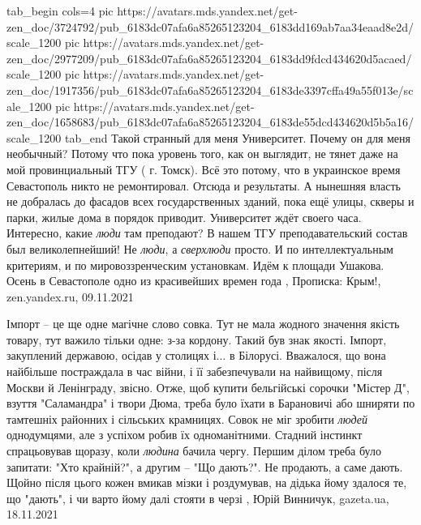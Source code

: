 \ifcmt
  tab_begin cols=4
     pic https://avatars.mds.yandex.net/get-zen_doc/3724792/pub_6183dc07afa6a85265123204_6183dd169ab7aa34eaad8e2d/scale_1200
     pic https://avatars.mds.yandex.net/get-zen_doc/2977209/pub_6183dc07afa6a85265123204_6183dd9fdcd434620d5acaed/scale_1200
		 pic https://avatars.mds.yandex.net/get-zen_doc/1917356/pub_6183dc07afa6a85265123204_6183de3397cffa49a55f013e/scale_1200
		 pic https://avatars.mds.yandex.net/get-zen_doc/1658683/pub_6183dc07afa6a85265123204_6183de55dcd434620d5b5a16/scale_1200
  tab_end
\fi
Такой странный для меня Университет. Почему он для меня необычный? Потому что
пока уровень того, как он выглядит, не тянет даже на мой провинциальный ТГУ (
г. Томск).  Всё это потому, что в украинское время Севастополь никто не
ремонтировал. Отсюда и результаты. А нынешняя власть не добралась до фасадов
всех государственных зданий, пока ещё улицы, скверы и парки, жилые дома в
порядок приводит. Университет ждёт своего часа.  Интересно, какие\emph{ люди}
там преподают? В нашем ТГУ преподавательский состав был великолепнейший! Не
\emph{люди}, а \emph{сверхлюди} просто. И по интеллектуальным критериям, и по
мировоззренческим установкам.  Идём к площади Ушакова. Осень в Севастополе одно
из красивейших времен года
, 
Прописка: Крым!, zen.yandex.ru, 09.11.2021

Імпорт – це ще одне магічне слово совка. Тут не мала жодного значення якість
товару, тут важило тільки одне: з-за кордону. Такий був знак якості. Імпорт,
закуплений державою, осідав у столицях і... в Білорусі. Вважалося, що вона
найбільше постраждала в час війни, і її забезпечували на найвищому, після
Москви й Ленінграду, звісно. Отже, щоб купити бельгійські сорочки "Містер Д",
взуття "Саламандра" і твори Дюма, треба було їхати в Барановичі або шниряти по
тамтешніх районних і сільських крамницях.  Совок не міг зробити \emph{людей}
однодумцями, але з успіхом робив їх одноманітними.  Стадний інстинкт
спрацьовував щоразу, коли \emph{людина} бачила чергу. Першим ділом треба було
запитати: "Хто крайній?", а другим – "Що дають?". Не продають, а саме дають.
Щойно після цього кожен вмикав мізки і роздумував, на дідька йому здалося те,
що "дають", і чи варто йому далі стояти в черзі
, 
Юрій Винничук, gazeta.ua, 18.11.2021

